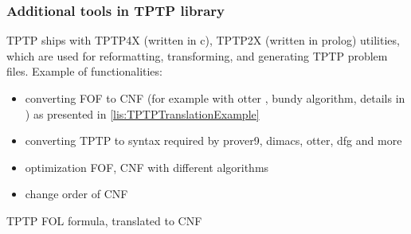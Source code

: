 \subsubsection{Additional tools in TPTP library}
\label{sub:AdditionalToolsInTPTPLibrary}

TPTP ships with \gls{TPTP4X} (written in c), \gls{TPTP2X} (written in prolog) utilities, which are used for reformatting, transforming, and generating TPTP problem files. Example of functionalities:

\begin{itemize}
  \item converting \gls{FOF} to \gls{CNF} (for example with otter \cite{McC-Otter-URL}, bundy \cite{Bun83} algorithm, details in \cite{SM96}) as presented in \ref{lis:TPTPTranslationExample}
  \item converting TPTP to syntax required by prover9, dimacs, otter, dfg and more
  \item optimization \gls{FOF}, \gls{CNF} with different algorithms
  \item change order of \gls{CNF}
\end{itemize}

\begin{listing}[H]
  \caption{TPTP FOL formula, translated to CNF}
  \label{lis:TPTPTranslationExample}
\end{listing}

